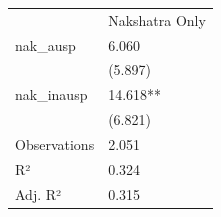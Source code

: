 \begin{tabular}{ll}
& Nakshatra Only \\
nak\_ausp & \num{6.060} \\
& (\num{5.897}) \\
nak\_inausp & \num{14.618}** \\
& (\num{6.821}) \\
Observations & \num{2,051} \\
R² & \num{0.324} \\
Adj. R² & \num{0.315} \\
\end{tabular}
